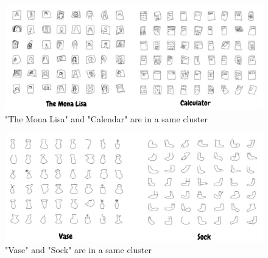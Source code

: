\begin{figure}[ht]
\begin{center}
   \includegraphics[width=1\linewidth]{figures/5.jpg}
\end{center}
   \caption{"The Mona Lisa" and "Calendar" are in a same cluster}
\label{fig:5}
\end{figure}

\begin{figure}[ht]
\begin{center}
   \includegraphics[width=1\linewidth]{figures/6.jpg}
\end{center}
   \caption{"Vase" and "Sock" are in a same cluster}
\label{fig:6}
\end{figure}